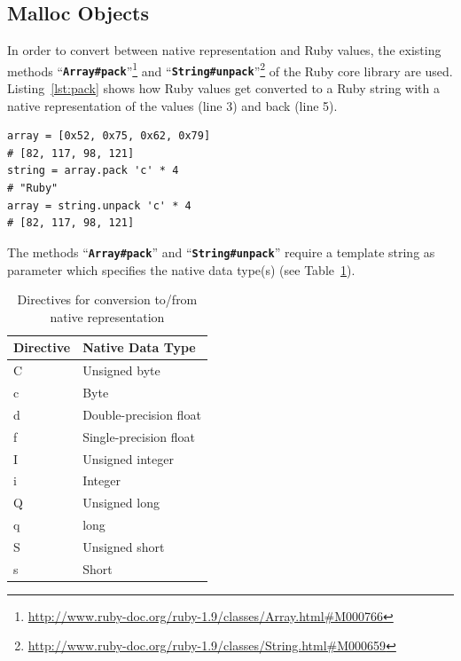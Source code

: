 \documentclass[12pt,a4paper,oneside,openright]{book}
\newcommand{\tbl}[1]{Table~\ref{tbl:#1}}
\newcommand{\lst}[1]{Listing~\ref{lst:#1}}
\newcommand{\code}[1]{``\texttt{\textbf{\textcolor{codegray}{\small{#1}}}}''}
\begin{document}
\begin{CJK}{UTF8}{}
\section{Malloc Objects}\label{cha:malloc}
In order to convert between native representation and Ruby values, the existing methods \code{Array\#pack}\footnote{\url{http://www.ruby-doc.org/ruby-1.9/classes/Array.html\#M000766}} and \code{String\#unpack}\footnote{\url{http://www.ruby-doc.org/ruby-1.9/classes/String.html\#M000659}} of the Ruby core library are used. \lst{pack} shows how Ruby values get converted to a Ruby string with a native representation of the values (line 3) and back (line 5).
\lstset{language=Ruby,frame=single,numbers=left}
\begin{lstlisting}[float=htbp,caption={Converting arrays to binary data and back},label=lst:pack]
array = [0x52, 0x75, 0x62, 0x79]
# [82, 117, 98, 121]
string = array.pack 'c' * 4
# "Ruby"
array = string.unpack 'c' * 4
# [82, 117, 98, 121]
\end{lstlisting}
The methods \code{Array\#pack} and \code{String\#unpack} require a template string as parameter which specifies the native data type(s) (see \tbl{directive}).
\begin{table}[htbp]
  \begin{center}
    \caption{Directives for conversion to/from native representation\label{tbl:directive}}\vspace{1em}
    \begin{tabular}{ll}\toprule
      \textbf{Directive} & \textbf{Native Data Type} \\\midrule
      C & Unsigned byte\\
      c & Byte\\
      d & Double-precision float\\
      f & Single-precision float\\
      I & Unsigned integer\\
      i & Integer\\
      Q & Unsigned long\\
      q & long\\
      S & Unsigned short\\
      s & Short\\\bottomrule
    \end{tabular}
  \end{center}
\end{table}


\end{CJK}
\end{document}
